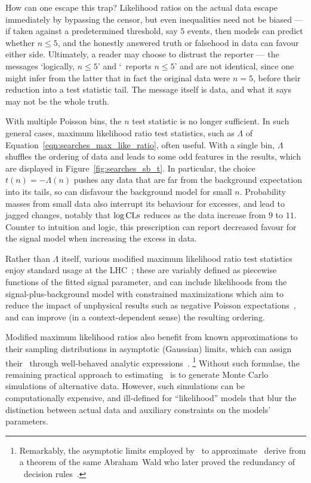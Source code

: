 How can one escape this trap?
Likelihood ratios on the actual data escape immediately by bypassing the
censor, but even inequalities need not be biased --- if taken against a
predetermined threshold, say $5$ events, then models can predict whether
$n \leq 5$, and the honestly answered truth or falsehood in data can favour
either side.
Ultimately, a reader may choose to distrust the reporter ---
the messages
`logically, $n \leq 5$' and
`\atlas\ reports $n \leq 5$' and  are not
identical, since one might infer from the latter that in fact the original
data were $n = 5$, before their reduction into a test statistic tail.
The message itself is data, and what it says may not be the whole truth.

With multiple Poisson bins, the $n$ test statistic is no longer
sufficient.
In such general cases, maximum likelihood ratio test statistics,
such as $\Lambda$ of Equation~\ref{eqn:searches_max_like_ratio}, often useful.
With a single bin, $\Lambda$ shuffles the ordering of
data and leads to some odd features in the results, which are displayed in
Figure~\ref{fig:searches_sb_t}.
In particular, the choice $t(n) = -\Lambda(n)$ pushes any data that are far
from the background expectation into its tails, so can disfavour the background
model for small $n$.
Probability masses from small data also interrupt its behaviour for excesses,
and lead to jagged changes, notably that $\log\mathrm{CLs}$ reduces as the data
increase from $9$ to $11$.
Counter to intuition and logic, this prescription can report decreased favour
for the signal model when increasing the excess in data.

Rather than $\Lambda$ itself, various modified maximum likelihood ratio test
statistics enjoy standard usage at the LHC~\cite{cern2011procedure};
these are variably defined as piecewise functions of the fitted signal
parameter, and can include likelihoods from the signal-plus-background
model with constrained maximizations which aim to reduce the impact of
unphysical results such as negative Poisson expectations~\cite{
Feldman:1997qc,
Cowan:2010js
},
and can improve (in a context-dependent sense) the resulting ordering.

Modified maximum likelihood ratios also benefit from known approximations to
their sampling distributions in asymptotic (Gaussian) limits,
which can assign their \pvalues\ through well-behaved analytic
expressions~\cite{
Cowan:2010js,
wilks1938large,
wald1943tests
}.%
\footnote{%
Remarkably, the asymptotic limits employed by~\cite{Cowan:2010js} to
approximate \pvalues\ derive from a theorem of the same Abraham~Wald who later
proved the redundancy of \pvalue\ decision rules~\cite{wald1947bayes}.%
}
Without such formulae, the remaining practical approach to estimating
\pvalues\ is to generate Monte Carlo simulations of alternative data.
However, such simulations can be computationally expensive, and ill-defined for
``likelihood'' models that blur the distinction between actual data and
auxiliary constraints on the models' parameters.


